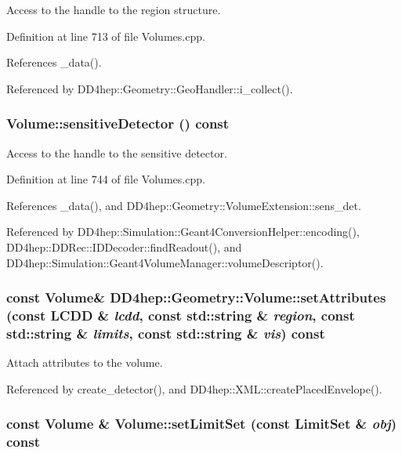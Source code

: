Access to the handle to the region structure. 

Definition at line 713 of file Volumes.cpp.

References \_\-data().

Referenced by DD4hep::Geometry::GeoHandler::i\_\-collect().\hypertarget{class_d_d4hep_1_1_geometry_1_1_volume_a8dcf0ca9c159ed116f3f85fd67efa336}{
\subsubsection[{sensitiveDetector}]{ Volume::sensitiveDetector () const}}
\label{class_d_d4hep_1_1_geometry_1_1_volume_a8dcf0ca9c159ed116f3f85fd67efa336}


Access to the handle to the sensitive detector. 

Definition at line 744 of file Volumes.cpp.

References \_\-data(), and DD4hep::Geometry::VolumeExtension::sens\_\-det.

Referenced by DD4hep::Simulation::Geant4ConversionHelper::encoding(), DD4hep::DDRec::IDDecoder::findReadout(), and DD4hep::Simulation::Geant4VolumeManager::volumeDescriptor().\hypertarget{class_d_d4hep_1_1_geometry_1_1_volume_add08120b9db1393b5db41b5cf2cd3e01}{
\subsubsection[{setAttributes}]{\setlength{\rightskip}{0pt plus 5cm}const {\bf Volume}\& DD4hep::Geometry::Volume::setAttributes (const {\bf LCDD} \& {\em lcdd}, \/  const std::string \& {\em region}, \/  const std::string \& {\em limits}, \/  const std::string \& {\em vis}) const}}
\label{class_d_d4hep_1_1_geometry_1_1_volume_add08120b9db1393b5db41b5cf2cd3e01}


Attach attributes to the volume. 

Referenced by create\_\-detector(), and DD4hep::XML::createPlacedEnvelope().\hypertarget{class_d_d4hep_1_1_geometry_1_1_volume_a9d569026c41f483a7f54a9a6947c96cd}{
\subsubsection[{setLimitSet}]{\setlength{\rightskip}{0pt plus 5cm}const {\bf Volume} \& Volume::setLimitSet (const {\bf LimitSet} \& {\em obj}) const}}
\label{class_d_d4hep_1_1_geometry_1_1_volume_a9d569026c41f483a7f54a9a6947c96cd}


